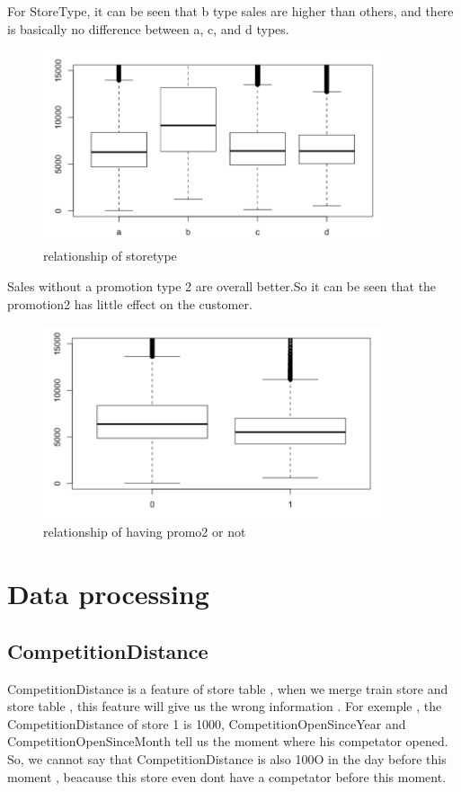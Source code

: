 \documentclass[12pt]{article}
\begin{document}
\newpage
For StoreType, it can be seen that b type sales are higher than others, and there is basically no difference between a, c, and d types.

\begin{figure}[h]
\centering
\includegraphics[width=10cm]{image/relationship_of_storetype.png}
\caption{relationship of storetype}
\label{fig11}
\end{figure}


Sales without a promotion type 2 are overall better.So it can be seen that the promotion2 has little effect on the customer.

\begin{figure}[h]
\centering
\includegraphics[width=10cm]{image/relationship_of_having_promo2_or_not.png}
\caption{relationship of having promo2 or not}
\label{fig13}
\end{figure}

\newpage
\section {Data processing}
\subsection{CompetitionDistance}
CompetitionDistance is a feature of store table , when we merge train store and store table , this feature will give us the wrong information . For exemple , the CompetitionDistance of store 1 is 1000, CompetitionOpenSinceYear and CompetitionOpenSinceMonth tell us the moment where his competator opened. So, we cannot say that CompetitionDistance is also 100O in the day before this moment , beacause this store even dont have a competator before this moment.
\end{document}
